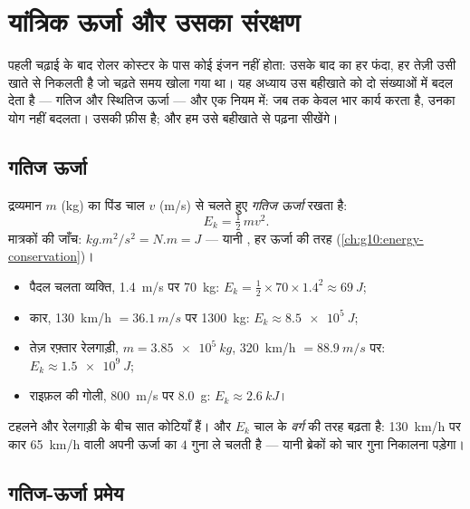 \chapter{यांत्रिक ऊर्जा और उसका संरक्षण}\label{ch:g11:mechanical-energy}

पहली चढ़ाई के बाद रोलर कोस्टर के पास कोई इंजन नहीं होता: उसके बाद का हर फंदा,
हर तेज़ी उसी खाते से निकलती है जो चढ़ते समय खोला गया था। यह अध्याय उस बहीखाते
को दो संख्याओं में बदल देता है --- गतिज और स्थितिज ऊर्जा --- और एक
नियम में: जब तक केवल भार कार्य करता है, उनका योग नहीं बदलता।
 उसकी फ़ीस है; और हम उसे बहीखाते से पढ़ना सीखेंगे।

\section{गतिज ऊर्जा}

\begin{definition}[गतिज ऊर्जा]\label{def:g11:mechanical-energy:kinetic}
द्रव्यमान $m$ (\unit{kg}) का पिंड चाल $v$ (\unit{m/s}) से चलते हुए
\emph{गतिज ऊर्जा} रखता है:
\[
E_k = \tfrac12\, m v^2 .
\]
मात्रकों की जाँच: $\unit{kg.m^2/s^2} = \unit{N.m} = \unit{J}$ --- यानी , हर ऊर्जा की
तरह (\cref{ch:g10:energy-conservation})।
\end{definition}

\begin{example}[परिमाण की कोटियाँ]\label{ex:g11:mechanical-energy:orders}
\begin{itemize}
  \item पैदल चलता व्यक्ति, \qty{1.4}{m/s} पर \qty{70}{kg}: $E_k = \tfrac12 \times 70 \times 1.4^2 \approx \qty{69}{J}$;
  \item कार, \qty{130}{km/h} $= \qty{36.1}{m/s}$ पर \qty{1300}{kg}: $E_k \approx \qty{8.5e5}{J}$;
  \item तेज़ रफ़्तार रेलगाड़ी, $m = \qty{3.85e5}{kg}$, \qty{320}{km/h} $= \qty{88.9}{m/s}$ पर: $E_k \approx \qty{1.5e9}{J}$;
  \item राइफ़ल की गोली, \qty{800}{m/s} पर \qty{8.0}{g}: $E_k \approx \qty{2.6}{kJ}$।
\end{itemize}
टहलने और रेलगाड़ी के बीच सात कोटियाँ हैं। और $E_k$ चाल के \emph{वर्ग} की
तरह बढ़ता है: \qty{130}{km/h} पर कार \qty{65}{km/h} वाली अपनी ऊर्जा का $4$ गुना ले
चलती है --- यानी ब्रेकों को चार गुना निकालना पड़ेगा।
\end{example}

\section{गतिज-ऊर्जा प्रमेय}

